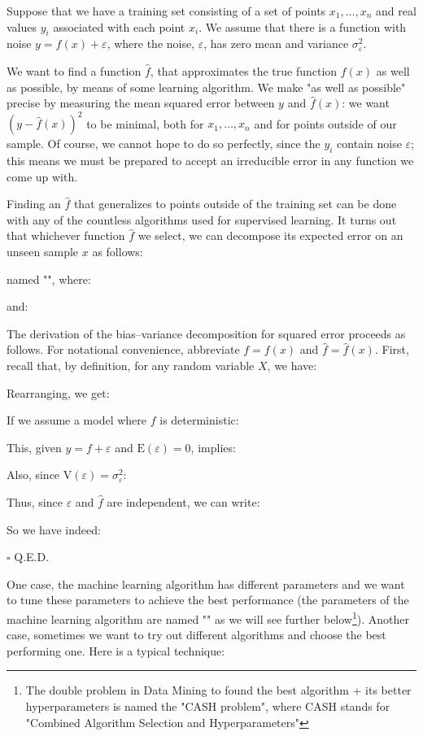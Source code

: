 	Suppose that we have a training set consisting of a set of points $x_{1},\dots ,x_{n}$ and real values $y_{i}$ associated with each point $x_{i}$. We assume that there is a function with noise $y=f(x)+\varepsilon$, where the noise, $\varepsilon$, has zero mean and variance $\sigma^{2}_\varepsilon$.
	
	We want to find a function $\hat{f}$, that approximates the true function $f(x)$ as well as possible, by means of some learning algorithm. We make "as well as possible" precise by measuring the mean squared error between $y$ and $\hat{f}(x)$: we want $(y-{\hat {f}}(x))^{2}$ to be minimal, both for $x_{1},\dots ,x_{n}$ and for points outside of our sample. Of course, we cannot hope to do so perfectly, since the $y_{i}$ contain noise $\varepsilon$; this means we must be prepared to accept an irreducible error in any function we come up with.
	
	\begin{theorem}
	Finding an $\hat{f}$ that generalizes to points outside of the training set can be done with any of the countless algorithms used for supervised learning. It turns out that whichever function $\hat{f}$ we select, we can decompose its expected error on an unseen sample $x$ as follows:
	
	named "", where:
	
	and:
	
	\end{theorem}
	\begin{dem}
	The derivation of the bias–variance decomposition for squared error proceeds as follows. For notational convenience, abbreviate $f = f(x)$ and $\hat{f}=\hat{f}(x)$. First, recall that, by definition, for any random variable $X$, we have:
	
	Rearranging, we get:
	
	If we assume a model where $f$ is deterministic:
	
	This, given $y=f+\varepsilon$ and $\text{E}(\varepsilon)=0$, implies:
	
	Also, since $\text{V}(\varepsilon)=\sigma_\varepsilon^2$:
	
	Thus, since $\varepsilon$ and $\hat{f}$ are independent, we can write:
	
	So we have indeed:
	
	\begin{flushright}
		$\square$  Q.E.D.
	\end{flushright}
	\end{dem}
	One case, the machine learning algorithm has different parameters and we want to tune these parameters to achieve the best performance (the parameters of the machine learning algorithm are named "" as we will see further below\footnote{The double problem in Data Mining to found the best algorithm + its better hyperparameters is named the "CASH problem", where CASH stands for "Combined Algorithm Selection and Hyperparameters"}). Another case, sometimes we want to try out different algorithms and choose the best performing one. Here is a typical technique:
	
